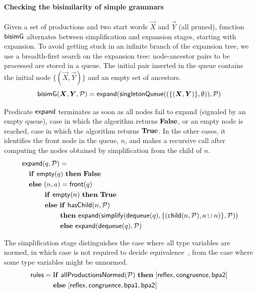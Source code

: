 \paragraph{Checking the bisimilarity of simple grammars}

Given a set of productions and two start words $\vec X$ and $\vec Y$
(all pruned), function $\mathsf{bisimG}$ alternates between simplification and
expansion stages, starting with expansion.
%
To avoid getting stuck in an infinite branch of the expansion tree, we
use a breadth-first search on the expansion tree: node-ancestor pairs
to be processed are stored in a queue. The initial pair inserted in the queue
contains the
initial node $\{(\vec X,\vec Y)\}$ and an empty set of ancestors.
%
\begin{equation*}
  \Bisim(\vec X, \vec Y, \productions) = \expand(
  \mathsf{singletonQueue}((\{(\vec X,\vec Y)\},\emptyset)),  
  \productions)
\end{equation*}

Predicate $\mathsf{expand}$ terminates as soon as all nodes fail to expand
(signaled by an empty queue), 
case in which the algorithm returns
$\mathbf{False}$, or an empty node is reached, case in which the algorithm
returns $\mathbf{True}$.
In the other cases, it identifies the front node in the queue, $n$,
and makes a recursive call after computing the nodes obtained by 
simplification from the child of $n$.
%
\begin{align*}
  &\mathsf{expand}(q, \mathcal P) =\\
  &\quad \mathbf{if}\ \mathsf{empty}(q)\ \mathbf{then}\ \mathbf{False}\\
  &\quad \mathbf{else}\ (n,a) = \mathsf{front}(q)\\
  & \qquad\quad\; \mathbf{if}\ \mathsf{empty}(n)\ \mathbf{then}\ \mathbf{True}\\
  & \qquad\quad\; \mathbf{else}\ \mathbf{if}\ \mathsf{hasChild}(n, \mathcal P)\\\
  & \qquad\qquad\quad\; \: \mathbf{then}\
    \mathsf{expand}(\mathsf{simplify}(\mathsf{dequeue}(q), 
    \{(\mathsf{child}(n, \mathcal P), a \cup n)\},\mathcal P))\\
  & \qquad\qquad\quad\;\: \mathbf{else}\ \mathsf{expand}(\mathsf{dequeue}(q), \mathcal P)
\end{align*}

The simplification stage distinguishes the case where all type
variables are normed, in which case  is not required to decide
equivalence~\cite{caucal1986decidabilite,DBLP:journals/iandc/ChristensenHS95},
from the case where some type variables might be unnormed.
%
\begin{align*}
  \mathsf{rules} =\;& \If\ \mathsf{allProductionsNormed(\productions)}\ \Then\
  [\mathsf{reflex} ,\mathsf{congruence}, \mathsf{bpa2}]\\
  &\Else\ [\mathsf{reflex} ,\mathsf{congruence}, \mathsf{bpa1} , \mathsf{bpa2}]
\end{align*}

